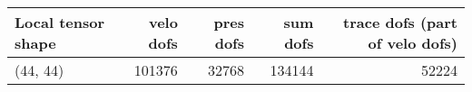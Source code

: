 \begin{tabular}{lrrrr}
\toprule
Local tensor shape &  velo dofs &  pres dofs &  sum dofs &  trace dofs (part of velo dofs) \\
\midrule
          (44, 44) &     101376 &      32768 &    134144 &                           52224 \\
\bottomrule
\end{tabular}
